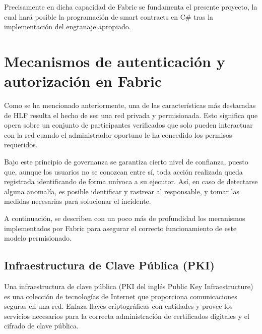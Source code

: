 
Precisamente en dicha capacidad de Fabric se fundamenta el presente proyecto, la cual har\'a posible la programaci\'on de smart contracts en C\# tras la implementaci\'on del engranaje apropiado.
 
\section{Mecanismos de autenticaci\'on y\\ autorizaci\'on en Fabric}
Como se ha mencionado anteriormente, una de las caracter\'isticas m\'as destacadas de HLF resulta el hecho de ser una red privada y permisionada. Esto significa que opera sobre un conjunto de participantes verificados que solo pueden interactuar con la red cuando el administrador oportuno le ha concedido los permisos requeridos. 

Bajo este principio de governanza se garantiza cierto nivel de confianza, puesto que, aunque los usuarios no se conozcan entre s\'i, toda acci\'on realizada queda registrada identificando de forma un\'ivoca a su ejecutor. As\'i, en caso de detectarse alguna anomal\'ia, es posible identificar y rastrear al responsable, y tomar las medidas necesarias para solucionar el incidente.

A continuaci\'on, se describen con un poco m\'as de profundidad los mecanismos implementados por Fabric para asegurar el correcto funcionamiento de este modelo permisionado.

\subsection{Infraestructura de Clave P\'ublica (PKI)}
Una infraestructura de clave p\'ublica (PKI del ingl\'es Public Key Infraestructure) es una colección de tecnolog\'ias de Internet que proporciona comunicaciones seguras en una red. Enlaza llaves criptogr\'aficas con entidades y provee los servicios necesarios para la correcta administraci\'on de certificados digitales y el cifrado de clave p\'ublica.

